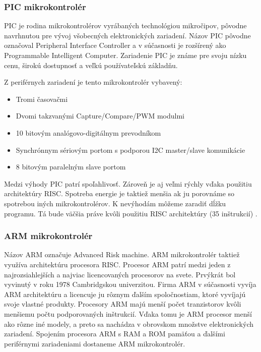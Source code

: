 \subsubsection{PIC mikrokontrolér}
\noindent \par
PIC je rodina mikrokontrolérov vyrábaných technológiou mikročipov, pôvodne navrhnutou pre vývoj všobecných elektronických zariadení.
Názov PIC pôvodne označoval Peripheral Interface Controller a v súčasnosti je
rozšírený ako Programmable Intelligent Computer. Zariadenie PIC je známe pre
svoju nízku cenu, širokú dostupnosť a veľkú používateľskú základňu. \par

Z periférnych zariadení je tento mikrokontrolér vybavený:
\begin{itemize}
    \item Tromi časovačmi
    \item Dvomi takzvanými Capture/Compare/PWM modulmi
    \item 10 bitovým analógovo-digitálnym prevodníkom
    \item Synchrónnym sériovým portom s podporou I2C master/slave komunikácie
    \item 8 bitovým paralelným slave portom
\end{itemize}

Medzi výhody PIC patrí spoľahlivosť. Zároveň je aj veľmi rýchly vďaka použitiu architektúry RISC.
Spotreba energie je taktiež menšia ak ju porovnáme so spotrebou iných mikrokontrolérov. K nevýhodám môžeme zaradiť dĺžku programu.
Tá bude väčšia práve kvôli použitiu RISC architektúry (35 inštrukcií) \cite{shidlingDifferentTypesMicrocontrollers2020}.

\subsubsection{ARM mikrokontrolér}
\noindent \par
Názov ARM označuje Advanced Risk machine. ARM mikrokontrolér taktiež využíva architektúru procesora RISC. Procesor ARM patrí medzi jeden z najrozsiahlejších
a najviac licencovaných procesorov na svete. Prvýkrát bol vyvinutý v roku 1978 Cambridgskou univerzitou. Firma ARM v súčasnosti vyvíja ARM architektúru a
licencuje ju rôznym ďalším spoločnostiam, ktoré vyvíjajú svoje vlastné produkty.
Procesory ARM majú menší počet tranzistorov kvôli menšiemu počtu podporovaných inštrukcií. Vďaka tomu je ARM procesor menší ako rôzne iné modely, a preto sa nachádza v obrovskom množstve elektronických zariadení. Spojením procesora ARM
s RAM a ROM pamäťou a ďalšími periférnymi zariadeniami dostaneme ARM mikrokontrolér.\par

